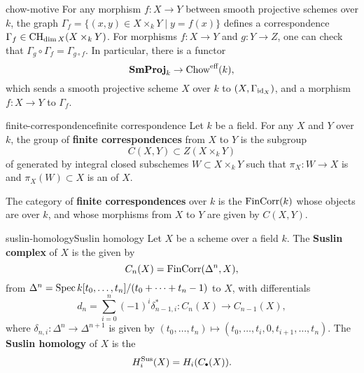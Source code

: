 \begin{example}{chow-motive}
    For any morphism $f \colon X \to Y$ between smooth projective schemes over $k$, the graph $\Gamma_f = \{ (x, y) \in X \times_k Y \mid y = f(x) \}$ defines a correspondence $\Gamma_f \in \textup{CH}_{\dim X}(X \times_k Y)$. For morphisms $f \colon X \to Y$ and $g \colon Y \to Z$, one can check that $\Gamma_g \circ \Gamma_f =\Gamma_{g \circ f}$. In particular, there is a functor
    \[ \textbf{SmProj}_k \to \textup{Chow}^\textup{eff}(k) , \]
    which sends a smooth projective scheme $X$ over $k$ to $(X, \Gamma_{\textup{id}_X})$, and a morphism $f \colon X \to Y$ to $\Gamma_f$.
\end{example}

\begin{topic}{finite-correspondence}{finite correspondence}
    Let $k$ be a field. For any  $X$ and $Y$ over $k$, the group of \textbf{finite correspondences} from $X$ to $Y$ is the subgroup
    \[ C(X, Y) \subset Z(X \times_k Y) \]
    of  generated by integral closed subschemes $W \subset X \times_k Y$ such that $\pi_X \colon W \to X$ is  and $\pi_X(W) \subset X$ is an  of $X$.
    
    The category of \textbf{finite correspondences} over $k$ is the  $\textup{FinCorr}(k)$ whose objects are   over $k$, and whose morphisms from $X$ to $Y$ are given by $C(X, Y)$.
\end{topic}

\begin{topic}{suslin-homology}{Suslin homology}
    Let $X$ be a  scheme over a field $k$. The \textbf{Suslin complex} of $X$ is the  given by 
    \[ C_n(X) = \textup{FinCorr}(\Delta^n, X) , \]
    from $\Delta^n = \operatorname{Spec} k[t_0, \ldots, t_n] / (t_0 + \cdots + t_n - 1)$ to $X$, with differentials
    \[ d_n = \sum_{i = 0}^{n} (-1)^i \delta_{n - 1, i}^* \colon C_n(X) \to C_{n - 1}(X) , \]
    where $\delta_{n, i} \colon \Delta^n \to \Delta^{n + 1}$ is given by $(t_0, \ldots, t_n) \mapsto (t_0, \ldots, t_i, 0, t_{i + 1}, \ldots, t_n)$.
    The \textbf{Suslin homology} of $X$ is the 
    \[ H^\textup{Sus}_i(X) = H_i(C_\bdot(X)) . \]
\end{topic}

